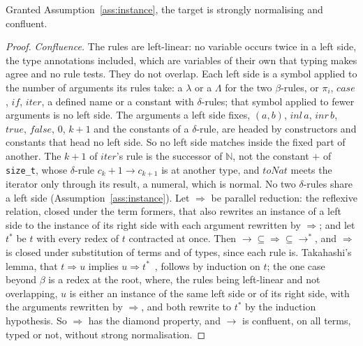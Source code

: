 \begin{proposition}
\label{prop:target}
Granted Assumption~\ref{ass:instance}, the target is strongly normalising and confluent.
\end{proposition}
\begin{proof}
\emph{Confluence.}
The rules are left-linear: no variable occurs twice in a left side, the type annotations included, which are variables of their own that typing makes agree and no rule tests.
They do not overlap.
Each left side is a symbol applied to the number of arguments its rules take: a $\lambda$ or a $\Lambda$ for the two $\beta$-rules, or $\pi_i$, $\mathit{case}$, $\mathit{if}$, $\mathit{iter}$, a defined name or a constant with $\delta$-rules; that symbol applied to fewer arguments is no left side.
The arguments a left side fixes, $(a, b)$, $\mathit{inl}\,a$, $\mathit{inr}\,b$, $\mathit{true}$, $\mathit{false}$, $0$, $k{+}1$ and the constants of a $\delta$-rule, are headed by constructors and constants that head no left side.
So no left side matches inside the fixed part of another.
The $k{+}1$ of $\mathit{iter}$'s rule is the successor of $\mathbb{N}$, not the constant $+$ of \texttt{size\_t}, whose $\delta$-rule $c_k + 1 \longrightarrow c_{k+1}$ is at another type, and $\mathit{toNat}$ meets the iterator only through its result, a numeral, which is normal.
No two $\delta$-rules share a left side (Assumption~\ref{ass:instance}).
Let $\Rightarrow$ be parallel reduction: the reflexive relation, closed under the term formers, that also rewrites an instance of a left side to the instance of its right side with each argument rewritten by $\Rightarrow$; and let $t^{*}$ be $t$ with every redex of $t$ contracted at once.
Then ${\longrightarrow} \subseteq {\Rightarrow} \subseteq {\longrightarrow^{*}}$, and $\Rightarrow$ is closed under substitution of terms and of types, since each rule is.
Takahashi's lemma, that $t \Rightarrow u$ implies $u \Rightarrow t^{*}$~\cite{takahashi1995parallel}, follows by induction on $t$; the one case beyond $\beta$ is a redex at the root, where, the rules being left-linear and not overlapping, $u$ is either an instance of the same left side or of its right side, with the arguments rewritten by $\Rightarrow$, and both rewrite to $t^{*}$ by the induction hypothesis.
So $\Rightarrow$ has the diamond property, and $\longrightarrow$ is confluent, on all terms, typed or not, without strong normalisation.


\end{proof}
